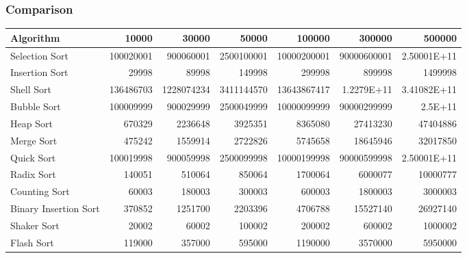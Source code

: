 \subsubsection{Comparison}

\vspace{5pt}

\begin{table}[h!]
\centering
\begin{tabular}{|l|r|r|r|r|r|r|}
\hline
\textbf{Algorithm} & \textbf{10000} & \textbf{30000} & \textbf{50000} & \textbf{100000} & \textbf{300000} & \textbf{500000} \\
\hline
Selection Sort & 100020001 & 900060001 & 2500100001 & 10000200001 & 90000600001 & 2.50001E+11 \\ \hline
Insertion Sort & 29998 & 89998 & 149998 & 299998 & 899998 & 1499998 \\ \hline
Shell Sort & 136486703 & 1228074234 & 3411144570 & 13643867417 & 1.2279E+11 & 3.41082E+11 \\ \hline
Bubble Sort & 100009999 & 900029999 & 2500049999 & 10000099999 & 90000299999 & 2.5E+11 \\ \hline
Heap Sort & 670329 & 2236648 & 3925351 & 8365080 & 27413230 & 47404886 \\ \hline
Merge Sort & 475242 & 1559914 & 2722826 & 5745658 & 18645946 & 32017850 \\ \hline
Quick Sort & 100019998 & 900059998 & 2500099998 & 10000199998 & 90000599998 & 2.50001E+11 \\ \hline
Radix Sort & 140051 & 510064 & 850064 & 1700064 & 6000077 & 10000777 \\ \hline
Counting Sort & 60003 & 180003 & 300003 & 600003 & 1800003 & 3000003 \\ \hline
Binary Insertion Sort & 370852 & 1251700 & 2203396 & 4706788 & 15527140 & 26927140 \\ \hline
Shaker Sort & 20002 & 60002 & 100002 & 200002 & 600002 & 1000002 \\ \hline
Flash Sort & 119000 & 357000 & 595000 & 1190000 & 3570000 & 5950000 \\
\hline
\end{tabular}
\label{table:number_of_comparisons}
\end{table}

